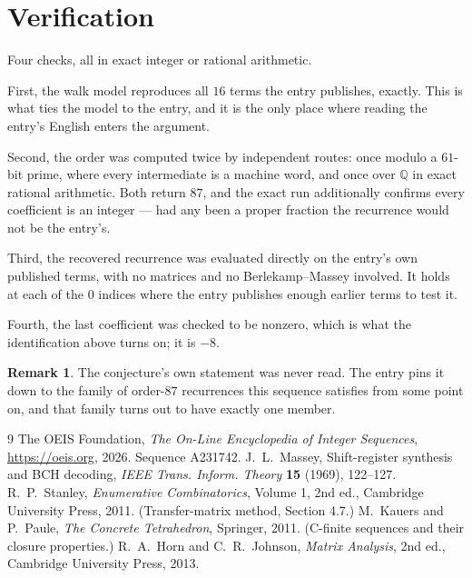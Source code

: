 \documentclass[11pt,a4paper]{article}
\theoremstyle{plain}
\theoremstyle{definition}
\newtheorem{remark}[theorem]{Remark}
\begin{document}
\section{Verification}

Four checks, all in exact integer or rational arithmetic.

First, the walk model reproduces all $16$ terms the entry publishes, exactly. This is
what ties the model to the entry, and it is the only place where reading the entry's English
enters the argument.

Second, the order was computed twice by independent routes: once modulo a $61$-bit prime, where
every intermediate is a machine word, and once over $\mathbb{Q}$ in exact rational arithmetic.
Both return $87$, and the exact run additionally confirms every coefficient is an integer
--- had any been a proper fraction the recurrence would not be the entry's.

Third, the recovered recurrence was evaluated directly on the entry's own published terms, with
no matrices and no Berlekamp--Massey involved. It holds at each of the $0$ indices where
the entry publishes enough earlier terms to test it.

Fourth, the last coefficient was checked to be nonzero, which is what the identification above
turns on; it is $-8$.

\begin{remark}
The conjecture's own statement was never read. The entry pins it down to the family of
order-$87$ recurrences this sequence satisfies from some point on, and that family turns
out to have exactly one member.
\end{remark}

\begin{thebibliography}{9}
 The OEIS Foundation, \emph{The On-Line Encyclopedia of Integer
Sequences}, \url{https://oeis.org}, 2026. Sequence A231742.
 J.~L.~Massey, Shift-register synthesis and BCH decoding, \emph{IEEE
Trans. Inform. Theory} \textbf{15} (1969), 122--127.
 R.~P.~Stanley, \emph{Enumerative Combinatorics}, Volume 1, 2nd ed.,
Cambridge University Press, 2011. (Transfer-matrix method, Section 4.7.)
 M.~Kauers and P.~Paule, \emph{The Concrete Tetrahedron}, Springer, 2011.
(C-finite sequences and their closure properties.)
 R.~A.~Horn and C.~R.~Johnson, \emph{Matrix Analysis}, 2nd ed., Cambridge
University Press, 2013.
\end{thebibliography}
\end{document}
